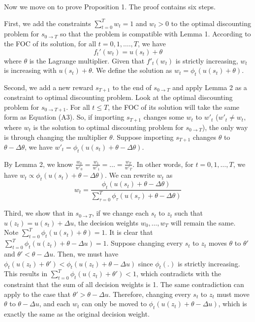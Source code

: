 \documentclass[
  12pt,
]{article}
\begin{document}
Now we move on to prove Proposition 1. The proof contains six steps.

First, we add the constraints \(\sum_{t=0}^T w_t=1\) and \(w_t>0\) to
the optimal discounting problem for \(s_{0\rightarrow T}\) so that the
problem is compatible with Lemma 1. According to the FOC of its
solution, for all \(t=0,1,….,T\), we have\[\tag{A3}
f_t'(w_t)=u(s_t)+\theta
\]where \(\theta\) is the Lagrange multiplier. Given that \(f'_t(w_t)\)
is strictly increasing, \(w_t\) is increasing with \(u(s_t)+\theta\). We
define the solution as \(w_t =\phi_t(u(s_t)+\theta)\).

Second, we add a new reward \(s_{T+1}\) to the end of
\(s_{0\rightarrow T}\) and apply Lemma 2 as a constraint to optimal
discounting problem. Look at the optimal discounting problem for
\(s_{0\rightarrow T+1}\). For all \(t\leq T\), the FOC of its solution
will take the same form as Equation (A3). So, if importing \(s_{T+1}\)
changes some \(w_t\) to \(w'_t\) (\(w'_t \neq w_t\), where \(w_t\) is
the solution to optimal discounting problem for \(s_{0\rightarrow T}\)),
the only way is through changing the multiplier \(\theta\). Suppose
importing \(s_{T+1}\) changes \(\theta\) to \(\theta-\Delta \theta\), we
have \(w'_t = \phi_t(u(s_t)+\theta-\Delta \theta)\).

By Lemma 2, we know
\(\frac{w_0}{w'_0}=\frac{w_1}{w'_1}=…=\frac{w_T}{w'_T}\). In other
words, for \(t=0,1,…,T\), we have
\(w_t \propto \phi_t(u(s_t)+\theta-\Delta \theta)\). We can rewrite
\(w_t\) as \[\tag{A4}
w_t = \frac{\phi_t(u(s_t)+\theta-\Delta \theta)}{\sum_{\tau=0}^{T}\phi_\tau(u(s_\tau)+\theta-\Delta \theta)}
\]

Third, we show that in \(s_{0\rightarrow T}\), if we change each \(s_t\)
to \(z_t\) such that \(u(z_t)=u(s_t)+\Delta u\), the decision weights
\(w_0,…,w_T\) will remain the same. Note
\(\sum_{t=0}^T \phi_t(u(s_t)+\theta)=1\). It is clear that
\(\sum_{t=0}^T \phi_t(u(z_t)+\theta-\Delta u)=1\). Suppose changing
every \(s_t\) to \(z_t\) moves \(\theta\) to \(\theta'\) and
\(\theta'<\theta-\Delta u\). Then, we must have
\(\phi_t(u(z_t)+\theta')<\phi_t(u(z_t)+\theta-\Delta u)\) since
\(\phi_t(.)\) is strictly increasing. This results in
\(\sum_{t=0}^T \phi_t(u(z_t)+\theta')<1\), which contradicts with the
constraint that the sum of all decision weights is 1. The same
contradiction can apply to the case that \(\theta'>\theta-\Delta u\).
Therefore, changing every \(s_t\) to \(z_t\) must move \(\theta\) to
\(\theta - \Delta u\), and each \(w_t\) can only be moved to
\(\phi_t(u(z_t)+\theta -\Delta u)\), which is exactly the same as the
original decision weight.
\end{document}
